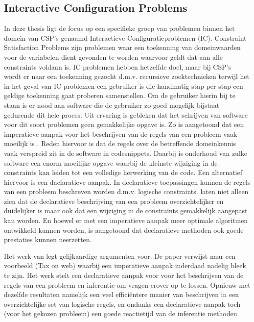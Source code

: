 \subsection{Interactive Configuration Problems}
In deze thesis ligt de focus op een specifieke groep van problemen binnen het domein van CSP's genaamd Interactieve Configuratieproblemen (IC). Constraint Satisfaction Problems zijn problemen waar een toekenning van domeinwaarden voor de variabelen dient gevonden te worden waarvoor geldt dat aan alle constraints voldaan is. IC problemen hebben hetzelfde doel, maar bij CSP's wordt er naar een toekenning gezocht d.m.v. recursieve zoektechnieken terwijl het in het geval van IC problemen een gebruiker is die handmatig stap per stap een geldige toekenning gaat proberen samenstellen. Om de gebruiker hierin bij te staan is er nood aan software die de gebruiker zo goed mogelijk bijstaat gedurende dit hele proces. Uit ervaring is gebleken dat het schrijven van software voor dit soort problemen geen gemakkelijke opgave is. Zo is aangetoond dat een imperatieve aanpak voor het beschrijven van de regels van een probleem vaak moeilijk is \citep{gelle1996interactive}. Reden hiervoor is dat de regels over de betreffende domeinkennis vaak verspreid zit in de software in codesnippets. Daarbij is onderhoud van zulke software een enorm moeilijke opgave waarbij de kleinste wijziging in de constraints kan leiden tot een volledige herwerking van de code. Een alternatief hiervoor is een daclaratieve aanpak. In declaratieve toepassingen kunnen de regels van een probleem beschreven worden d.m.v. logische constraints. \cite{gelle1996interactive} laten niet alleen zien dat de declaratieve beschrijving van een probleem overzichtelijker en duidelijker is maar ook dat een wijziging in de constraints gemakkelijk aangepast kan worden. En hoewel er met een imperatieve aanpak meer optimale algoritmen ontwikkeld kunnen worden, is aangetoond dat declaratieve methoden ook goede prestaties kunnen neerzetten. 

Het werk van\citep{vlaeminck2009logical} legt gelijkaardige argumenten voor. De paper verwijst naar een voorbeeld (Tax on web) waarbij een imperatieve aanpak inderdaad nadelig bleek te zijn. Het werk stelt een declaratieve aanpak voor voor het beschrijven van de regels van een probleem en inferentie om vragen erover op te lossen. Opnieuw met dezelfde resultaten namelijk een veel effici\"{e}ntere manier van beschrijven in een overzichtelijke set van logische regels, en ondanks een declaratieve aanpak toch (voor het gekozen probleem) een goede reactietijd van de inferentie methoden.


